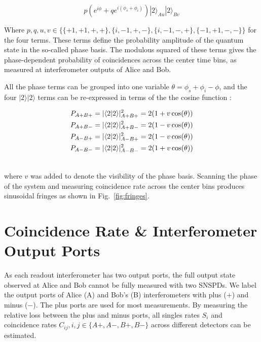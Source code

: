 \documentclass[11pt]{caltech_thesis} %
\begin{document}
$$p\left(e^{i \phi}+qe^{i\left(\phi_s+\phi_i\right)}\right)|2\rangle_{Au}|2\rangle_{Bv} $$

Where $p, q, u, v \in \{\{+1,+1, +, +\}, \{i,-1, +, -\}, \{i,-1, -, +\}, \{-1,+1, -, -\}\}$ for the four terms. These terms define the probability amplitude of the quantum state in the so-called phase basis. The modulous squared of these terms gives the phase-dependent probability of coincidences across the center time bins, as measured at interferometer outputs of Alice and Bob.

All the phase terms can be grouped into one variable $\theta = \phi_s + \phi_i - \phi$, and the four $|2\rangle|2\rangle$ terms can be re-expressed in terms of the the cosine function \autocite{Marcikic2002,Kim2022}:

\hypertarget{eq:cosines}{}{ 
\begin{align}
P_{A+ B+} &= |\langle 2|2\rangle|^2_{A+ B+} = 2(1 + v \cos(\theta)) \label{eq:cosines}\\
P_{A+ B-} &= |\langle 2|2\rangle|^2_{A+ B-} = 2(1 - v \cos(\theta)) \notag \\
P_{A- B+} &= |\langle 2|2\rangle|^2_{A- B+} = 2(1 - v \cos(\theta)) \notag \\
P_{A- B-} &= |\langle 2|2\rangle|^2_{A- B-} = 2(1 + v \cos(\theta)) \notag \\ \notag
\end{align}
}

where $v$ was added to denote the visibility of the phase basis. Scanning the phase of the system and measuring coincidence rate across the center bins produces sinusoidal fringes as shown in Fig.~\ref{fig:fringes}.

\hypertarget{coincidence-rate-interferometer-output-ports}{%
\section{Coincidence Rate \& Interferometer Output Ports}\label{coincidence-rate-interferometer-output-ports}}

As each readout interferometer has two output ports, the full output state observed at Alice and Bob cannot be fully measured with two SNSPDs. We label the output ports of Alice (A) and Bob's (B) interferometers with plus ($+$) and minus ($-$). The plus ports are used for most measurements. By measuring the relative loss between the plus and minus ports, all singles rates $S_i$ and coincidence rates $C_{ij}, i,j \in \{A+, A-, B+, B-\}$ across different detectors can be estimated.
\end{document}
